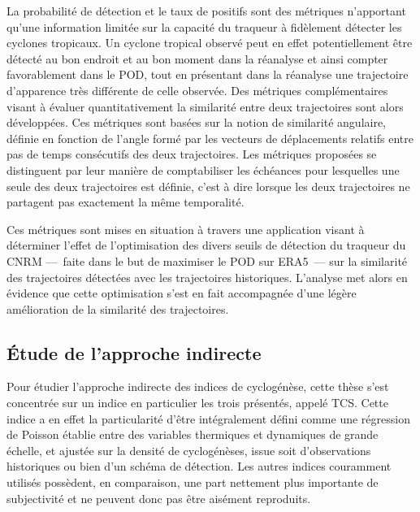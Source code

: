 \documentclass[../main.tex]{subfiles}
\begin{document}
La probabilité de détection et le taux de positifs sont des métriques n'apportant qu'une information limitée sur la capacité du traqueur à fidèlement détecter
les cyclones tropicaux. Un cyclone tropical observé peut en effet potentiellement être détecté au bon endroit et au bon moment dans la réanalyse et ainsi
compter favorablement dans le POD, tout en présentant dans la réanalyse une trajectoire d'apparence très différente de celle observée. Des métriques
complémentaires visant à évaluer quantitativement la similarité entre deux trajectoires sont alors développées. Ces métriques sont basées sur la notion de
similarité angulaire, définie en fonction de l'angle formé par les vecteurs de déplacements relatifs entre pas de temps consécutifs des deux trajectoires. Les
métriques proposées se distinguent par leur manière de comptabiliser les échéances pour lesquelles une seule des deux trajectoires est définie, c'est à dire
lorsque les deux trajectoires ne partagent pas exactement la même temporalité. 

Ces métriques sont mises en situation à travers une application visant à déterminer l'effet de l'optimisation des divers seuils de détection du traqueur du CNRM
---~faite dans le but de maximiser le POD sur ERA5~--- sur la similarité des trajectoires détectées avec les trajectoires historiques. L'analyse met alors en
évidence que cette optimisation s'est en fait accompagnée d'une légère amélioration de la similarité des trajectoires.

\subsection*{Étude de l'approche indirecte}

Pour étudier l'approche indirecte des indices de cyclogénèse, cette thèse s'est concentrée sur un indice en particulier les trois présentés, appelé TCS. Cette indice a en effet la particularité d'être intégralement défini comme une régression de Poisson établie entre des
variables thermiques et dynamiques de grande échelle, et ajustée sur la densité de cyclogénèses, issue soit d'observations historiques ou bien d'un schéma de
détection. Les autres indices couramment utilisés possèdent, en comparaison, une part nettement plus importante de subjectivité et ne peuvent donc pas être
aisément reproduits.
\end{document}

